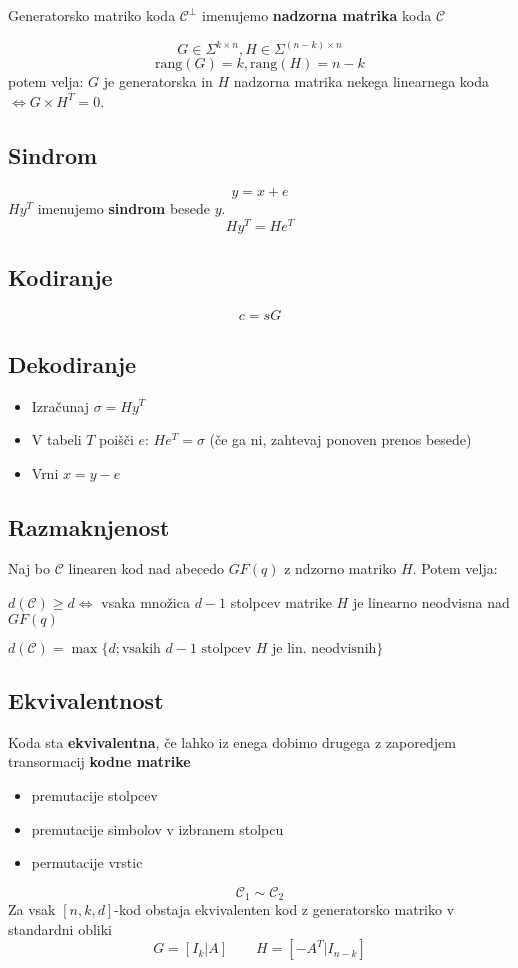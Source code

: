 \begin{multicols}{5}
Generatorsko matriko koda $\mathcal{C}^\perp $ imenujemo \textbf{nadzorna matrika} koda $\mathcal{C}$

\[G\in \Sigma^{k\times n}, H\in \Sigma^{(n-k)\times n}\]
\[\text{rang}(G) = k, \text{rang}(H) = n-k\]
potem velja: $G$ je generatorska in $H$ nadzorna matrika nekega linearnega koda
$\iff G\times H^T=0$.

\subsection{Sindrom}
\[y = x+e\]
$Hy^T$ imenujemo \textbf{sindrom} besede $y$.
\[Hy^T = He^T\]

\subsection{Kodiranje}
\[c = s G\]

\subsection{Dekodiranje}
\begin{itemize}
	\item Izračunaj $\sigma = Hy^T$
	\item V tabeli $T$ poišči $e$: $He^T = \sigma$
		(če ga ni, zahtevaj ponoven prenos besede)
	\item Vrni $x = y-e$
\end{itemize}
\subsection{Razmaknjenost}
Naj bo $\mathcal{C}$ linearen kod nad abecedo $GF(q)$ z ndzorno matriko $H$.
Potem velja:

$d(\mathcal{C})\ge d \iff $ vsaka množica $d-1$ stolpcev matrike $H$ je linearno neodvisna nad $GF(q)$

$d(\mathcal{C}) = \max\{d;\text{vsakih $d-1$ stolpcev $H$ je lin. neodvisnih}\} $

\subsection*{Ekvivalentnost}
Koda sta \textbf{ekvivalentna}, če lahko iz enega dobimo drugega z zaporedjem transormacij \textbf{kodne matrike}
\begin{itemize}
	\item premutacije stolpcev
	\item premutacije simbolov v izbranem stolpcu
	\item permutacije vrstic
\end{itemize}
\[\mathcal{C}_1\sim\mathcal{C}_2\]
Za vsak $[n,k,d]$-kod obstaja ekvivalenten kod z generatorsko matriko v standardni obliki
\[G = [I_k|A] \qquad H = [-A^T | I_{n-k}]\]


\end{multicols}
